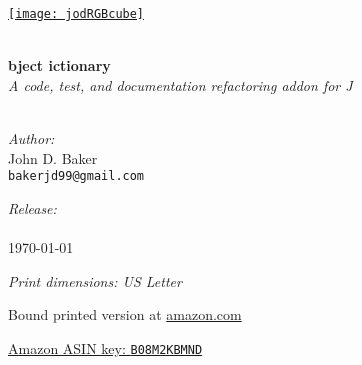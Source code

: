 \begin{titlepage}
 
\begin{center}
 
 
\href{https://bakerjd99.wordpress.com/the-jod-page/}{\texttt{[image: jodRGBcube]}} 
 
\HRule \\[0.8cm]

{ \Huge \bfseries {} bject ictionary}\\[0.4cm]

\textsl{A code, test, and documentation refactoring addon for J}\\[0.4cm]
 
\HRule \\[0.8cm]
 
 
\begin{minipage}{0.4\textwidth}
\begin{flushleft}
\emph{Author:}\\
John D. Baker \\
\texttt{bakerjd99@gmail.com} \\
\end{flushleft}
\end{minipage}
\begin{minipage}{0.4\textwidth}
\begin{flushright}
\emph{Release:}\\
\jodversion \\
\today \\
\end{flushright}
\end{minipage}

\vspace{0.8cm}

\emph{Print dimensions: US Letter}

Bound printed version at \href{https://www.amazon.com/dp/B08M2KBMND}{amazon.com} 

\href{https://www.amazon.com/dp/B08M2KBMND}{Amazon ASIN key: \texttt{B08M2KBMND}}


\end{center}
\end{titlepage}
